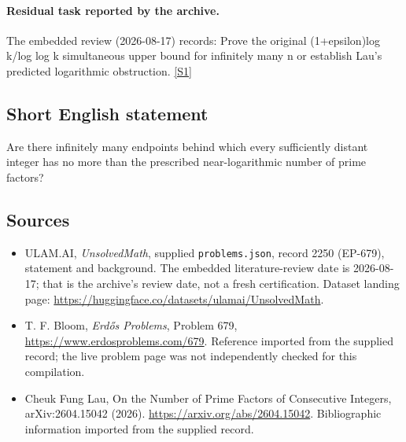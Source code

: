 \documentclass[11pt,a4paper]{article}
\newcommand{\sref}[2]{\hyperlink{source:#1:#2}{[S#2]}}
\begin{document}
\paragraph{Residual task reported by the archive.}

The embedded review (2026-08-17) records: Prove the original (1+epsilon)log k/log log k simultaneous upper bound for infinitely many n or establish Lau's predicted logarithmic obstruction. \sref{2250}{1}

\subsection{Short English statement}

Are there infinitely many endpoints behind which every sufficiently distant integer has no more than the prescribed near-logarithmic number of prime factors?

\subsection{Sources}

{\small

\begin{itemize}

\item[\hypertarget{source:2250:1}{S1}] ULAM.AI, \emph{UnsolvedMath}, supplied \texttt{problems.json}, record 2250 (EP-679), statement and background. The embedded literature-review date is 2026-08-17; that is the archive’s review date, not a fresh certification. Dataset landing page: \url{https://huggingface.co/datasets/ulamai/UnsolvedMath}.

\item[\hypertarget{source:2250:2}{S2}] T. F. Bloom, \emph{Erdős Problems}, Problem 679, \url{https://www.erdosproblems.com/679}. Reference imported from the supplied record; the live problem page was not independently checked for this compilation.

\item[\hypertarget{source:2250:3}{S3}] Cheuk Fung Lau, On the Number of Prime Factors of Consecutive Integers, arXiv:2604.15042 (2026). \url{https://arxiv.org/abs/2604.15042}. Bibliographic information imported from the supplied record.

\end{itemize}

}

\label{end:2250}
\end{document}
